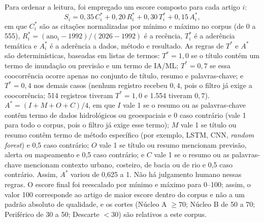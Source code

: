 

Para ordenar a leitura, foi empregado um escore composto para cada artigo $i$:
%
\begin{equation}
S_i = 0{,}35\,C_i^{*} + 0{,}20\,R_i^{*} + 0{,}30\,T_i^{*} + 0{,}15\,A_i^{*},
\label{eq:escore}
\end{equation}
%
em que $C_i^{*}$ são as citações normalizadas por mínimo e máximo no corpus (de 0 a 555), $R_i^{*}=(\text{ano}_i-1992)/(2026-1992)$ é a recência, $T_i^{*}$ é a aderência temática e $A_i^{*}$ é a aderência a dados, método e resultado. As regras de $T^{*}$ e $A^{*}$ são determinísticas, baseadas em listas de termos: $T^{*}=1{,}0$ se o título contém um termo de inundação ou previsão e um termo de IA/ML; $T^{*}=0{,}7$ se essa coocorrência ocorre apenas no conjunto de título, resumo e palavras-chave; e $T^{*}=0{,}4$ nos demais casos (nenhum registro recebeu $0{,}4$, pois o filtro já exige a coocorrência; 514 registros tiveram $T^{*}=1{,}0$ e 1.554 tiveram $0{,}7$). $A^{*}=(I+M+O+C)/4$, em que $I$ vale 1 se o resumo ou as palavras-chave contêm termo de dados hidrológicos ou geoespaciais e 0 caso contrário (vale 1 para todo o corpus, pois o filtro já exige esse termo); $M$ vale 1 se título ou resumo contêm termo de método específico (por exemplo, LSTM, CNN, \textit{random forest}) e 0,5 caso contrário; $O$ vale 1 se título ou resumo mencionam previsão, alerta ou mapeamento e 0,5 caso contrário; e $C$ vale 1 se o resumo ou as palavras-chave mencionam contexto urbano, costeiro, de bacia ou de rio e 0,5 caso contrário. Assim, $A^{*}$ variou de 0,625 a 1. Não há julgamento humano nessas regras. O escore final foi reescalado por mínimo e máximo para 0--100; assim, o valor 100 corresponde ao artigo de maior escore dentro do corpus e não a um padrão absoluto de qualidade, e os cortes (Núcleo A $\geq 70$; Núcleo B de 50 a 70; Periférico de 30 a 50; Descarte $<30$) são relativos a este corpus.

